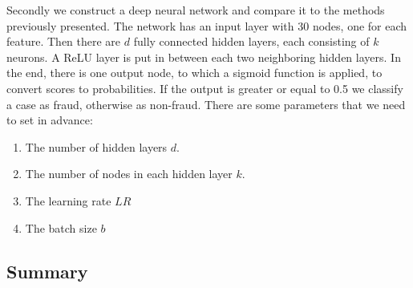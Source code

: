 \documentclass[utf8x]{ctexart}
\begin{document}
Secondly we construct a deep neural network and compare it to the methods previously presented.
The network has an input layer with 30 nodes, one for each feature. Then there are $d$ fully connected hidden layers, each consisting of $k$ neurons. A ReLU layer is put in between each two neighboring hidden layers. In the end, there is one output node, to which a sigmoid function is applied, to convert scores to probabilities. If the output is greater or equal to 0.5 we classify a case as fraud, otherwise as non-fraud.
There are some parameters that we need to set in advance:
\begin{enumerate}
  \item The number of hidden layers $d$.
  \item The number of nodes in each hidden layer $k$.
  \item The learning rate $LR$
  \item The batch size $b$
\end{enumerate}



\subsection{Summary}

\newpage
{}
\renewcommand\refname{Bibliography}


\end{document}
